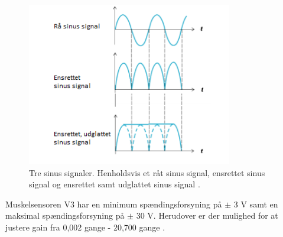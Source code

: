 \begin{figure}[H]
\centering
\includegraphics[width=0.8\textwidth]{figures/sinussignal.png}
\caption{Tre sinus signaler. Henholdsvis et råt sinus signal, ensrettet sinus signal og ensrettet samt udglattet sinus signal \citep{advancertech2013}.}
\label{fig:sinussignal}
\end{figure}

Muskelsensoren V3 har en minimum spændingsforsyning på $\pm$ 3 V samt en maksimal spændingsforsyning på $\pm$ 30 V. Herudover er der mulighed for at justere gain fra 0,002 gange - 20,700 gange \citep{advancertech2013}.







